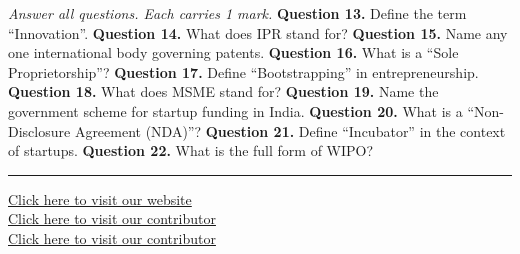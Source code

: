 \documentclass[11pt,a4paper]{article}
\begin{document}
\medskip\noindent\textit{Answer all questions. Each carries 1 mark.}
\bigskip
\noindent\textbf{Question 13.} Define the term ``Innovation''.
\medskip\noindent\textbf{Question 14.} What does IPR stand for?
\medskip\noindent\textbf{Question 15.} Name any one international body governing patents.
\medskip\noindent\textbf{Question 16.} What is a ``Sole Proprietorship''?
\medskip\noindent\textbf{Question 17.} Define ``Bootstrapping'' in entrepreneurship.
\medskip\noindent\textbf{Question 18.} What does MSME stand for?
\medskip\noindent\textbf{Question 19.} Name the government scheme for startup funding in India.
\medskip\noindent\textbf{Question 20.} What is a ``Non-Disclosure Agreement (NDA)''?
\medskip\noindent\textbf{Question 21.} Define ``Incubator'' in the context of startups.
\medskip\noindent\textbf{Question 22.} What is the full form of WIPO?
\vfill
\rule{\linewidth}{0.4pt}
\begin{center}\small
\href{https://bhu-exam.vercel.app/}{Click here to visit our website}\\[4pt]\href{https://me-aryan.vercel.app/}{Click here to visit our contributor}\\[4pt]\href{https://quashan-me.vercel.app/}{Click here to visit our contributor}
\end{center}
\end{document}
